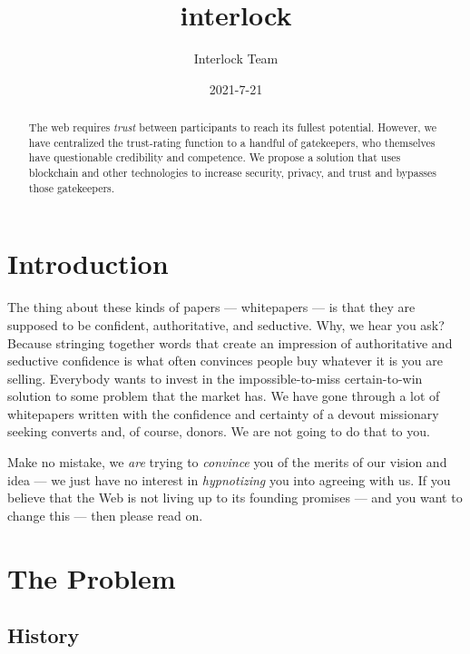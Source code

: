 \documentclass[a4paper]{article}
\title{interlock}
\author{Interlock Team}
\date{2021-7-21}
\begin{document}
\maketitle
\tableofcontents
\begin{abstract}
The web requires \emph{trust} between participants to reach its fullest potential. However, we have centralized the trust-rating function to a handful of gatekeepers, who themselves have questionable credibility and competence. We propose a solution that uses blockchain and other technologies to increase security, privacy, and trust and bypasses those gatekeepers.\end{abstract}
\section{Introduction}
\label{Introduction}

The thing about these kinds of papers ---  whitepapers ---  is that they are supposed to be confident, authoritative, and seductive. Why, we hear you ask? Because stringing together words that create an impression of authoritative and seductive confidence is what often convinces people buy whatever it is you are selling. Everybody wants to invest in the impossible-to-miss certain-to-win solution to some problem that the market has. We have gone through a lot of whitepapers written with the confidence and certainty of a devout missionary seeking converts and, of course, donors. We are not going to do that to you.

Make no mistake, we \emph{are} trying to \emph{convince} you of the merits of our vision and idea ---  we just have no interest in \emph{hypnotizing} you into agreeing with us. If you believe that the Web is not living up to its founding promises ---  and you want to change this ---  then please read on.
\section{The Problem}
\label{The Problem}
\subsection{History}
\label{History}
\end{document}
